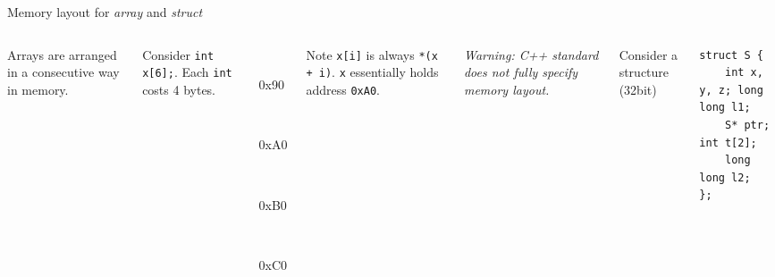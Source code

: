 \begin{frame}[fragile]{Memory layout for \textit{array} and \textit{struct}}
\begin{columns}
	
	Arrays are arranged in a consecutive way in memory. 
	
	Consider \texttt{int x[6];}. Each \texttt{int} costs 4 bytes. 

\vspace{.2in}
\begin{bytefield}[leftcurly=., leftcurlyspace=0pt]{16}
	\\
	\begin{leftwordgroup}{0x90}
	\end{leftwordgroup}\\
	\begin{leftwordgroup}{0xA0}
	\end{leftwordgroup}\\
	\begin{leftwordgroup}{0xB0}
	\end{leftwordgroup}\\
	\begin{leftwordgroup}{0xC0}
	\end{leftwordgroup}\\
\end{bytefield}
Note \texttt{x[i]} is always \texttt{*(x + i)}. \texttt{x} essentially holds address \texttt{0xA0}.\\

	
	\textit{\small{Warning: C++ standard does not fully specify memory layout.}}
	
	Consider a structure (32bit)
\begin{verbatim}
struct S {
    int x, y, z; long long l1;
    S* ptr; int t[2]; 
    long long l2;
};
\end{verbatim}


\end{columns}
\end{frame}
